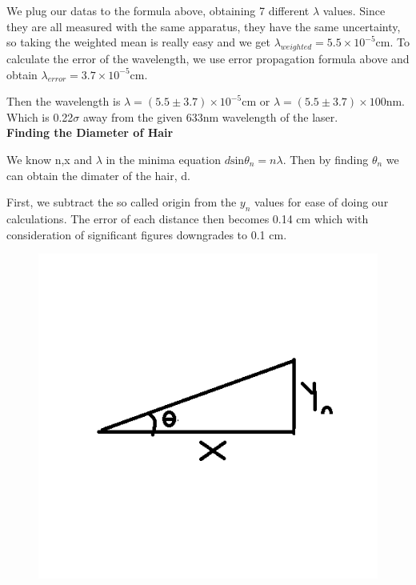 \documentclass[10pt,a4paper]{article}
\begin{document}
{\begin{figure}[H]
\begin{center}
	\end{center}
\end{figure}
\par We plug our datas to the formula above, obtaining 7 different $\lambda$ values. Since they are all measured with the same apparatus, they have the same uncertainty, so taking the weighted mean is really easy and we get $\lambda_{weighted}=5.5\times 10^{-5}$cm. To calculate the error of the wavelength, we use error propagation formula above and obtain $\lambda_{error}=3.7\times 10^{-5}$cm.
\par Then the wavelength is  $\lambda=(5.5\pm3.7)\times 10^{-5}$cm or $\lambda=(5.5\pm3.7)\times100$nm. Which is 0.22$\sigma$ away from the given 633nm wavelength of the laser.
\\[\baselineskip]
\textbf{\small{Finding the Diameter of Hair}}
\par We know n,x and $\lambda$ in the minima equation $d\mathrm{sin}{\theta }_{n}=n\lambda$. Then by finding $\theta_n$ we can obtain the dimater of the hair, d.
\par First, we subtract the so called origin from the $y_n$ values for ease of doing our calculations. The error of each distance then becomes 0.14 cm which with consideration of significant figures downgrades to 0.1 cm.
\begin{figure}[H]
	\begin{center}
		\includegraphics[scale=0.6]{Arctan.png}

\end{center}
\end{figure}}
\end{document}
